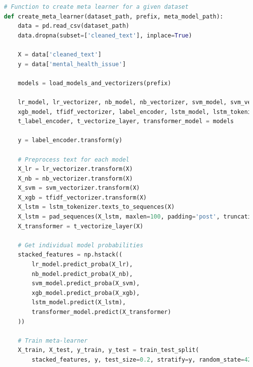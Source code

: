     \begin{tcolorbox}[colback=gray!5!white, colframe=gray!80!black, boxrule=0.5pt, title=Hierarchical Ensemble Model 1] 
        \begin{lstlisting}[language=Python]
# Function to create meta learner for a given dataset
def create_meta_learner(dataset_path, prefix, meta_model_path):
    data = pd.read_csv(dataset_path)
    data.dropna(subset=['cleaned_text'], inplace=True)

    X = data['cleaned_text']
    y = data['mental_health_issue']

    models = load_models_and_vectorizers(prefix)

    lr_model, lr_vectorizer, nb_model, nb_vectorizer, svm_model, svm_vectorizer, \
    xgb_model, tfidf_vectorizer, label_encoder, lstm_model, lstm_tokenizer, \
    t_label_encoder, t_vectorize_layer, transformer_model = models

    y = label_encoder.transform(y)

    # Preprocess text for each model
    X_lr = lr_vectorizer.transform(X)
    X_nb = nb_vectorizer.transform(X)
    X_svm = svm_vectorizer.transform(X)
    X_xgb = tfidf_vectorizer.transform(X)
    X_lstm = lstm_tokenizer.texts_to_sequences(X)
    X_lstm = pad_sequences(X_lstm, maxlen=100, padding='post', truncating='post')
    X_transformer = t_vectorize_layer(X)

    # Get individual model probabilities
    stacked_features = np.hstack((
        lr_model.predict_proba(X_lr),
        nb_model.predict_proba(X_nb),
        svm_model.predict_proba(X_svm),
        xgb_model.predict_proba(X_xgb),
        lstm_model.predict(X_lstm),
        transformer_model.predict(X_transformer)
    ))

    # Train meta-learner
    X_train, X_test, y_train, y_test = train_test_split(
        stacked_features, y, test_size=0.2, stratify=y, random_state=42)
\end{lstlisting}
    \end{tcolorbox}

